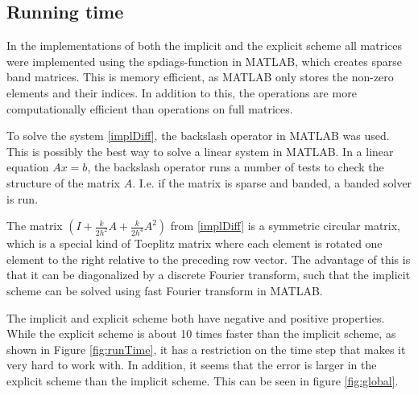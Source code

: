 \subsection{Running time}
In the implementations of both the implicit and the explicit scheme all matrices were implemented using the spdiags-function in MATLAB, which creates sparse band matrices. This is memory efficient, as MATLAB only stores the non-zero elements and their indices. In addition to this, the operations are more computationally efficient than operations on full matrices. \cite{sparse}

To solve the system \eqref{implDiff}, the backslash operator in MATLAB was used. This is possibly the best way to solve a linear system in MATLAB.  In a linear equation $Ax = b$, the backslash operator runs a number of tests to check the structure of the matrix $A$. I.e. if the matrix is sparse and banded, a banded solver is run.

The matrix $\left( I + \frac{k}{2h^2}A + \frac{k}{2h^4}A^2\right)$ from \eqref{implDiff} is a symmetric circular matrix, which is a special kind of Toeplitz matrix where each element is rotated one element to the right relative to the preceding row vector. The advantage of this is that it can be diagonalized by a discrete Fourier transform, such that the implicit scheme can be solved using fast Fourier transform in MATLAB.

The implicit and explicit scheme both have negative and positive properties. While the explicit scheme is about 10 times faster than the implicit scheme, as shown in Figure \ref{fig:runTime}, it has a restriction on the time step that makes it very hard to work with. In addition, it seems that the error is larger in the explicit scheme than the implicit scheme. This can be seen in figure \ref{fig:global}.

